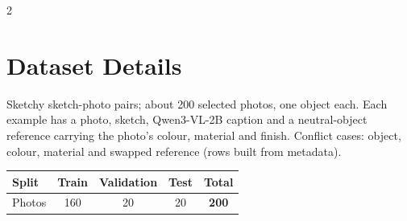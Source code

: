 \documentclass[a1,portrait]{a0poster}
\begin{document}
\begin{minipage}[c]{\linewidth}
\begin{framed}
\begin{multicols}{2}
\color{Black}
\section*{Dataset Details}
Sketchy sketch-photo pairs; about 200 selected photos, one object each. Each example has a photo, sketch, Qwen3-VL-2B caption and a neutral-object reference carrying the photo's colour, material and finish. Conflict cases: object, colour, material and swapped reference (rows built from metadata).
\begin{center}
	\begin{tabular}{|l|c|c|c|c|}
		\hline
		Split & Train & Validation & Test & Total\\
		\hline
		Photos & 160 & 20 & 20 & \textbf{200}\\
		\hline
	\end{tabular}
\end{center}

\color{Black}

\end{multicols}
\end{framed}
\end{minipage}
\end{document}
